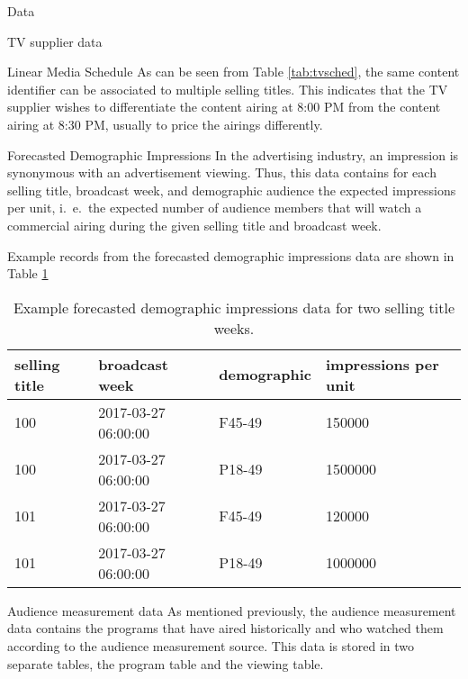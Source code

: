 \begin{chapter}{Data}
\begin{section}{TV supplier data}
\begin{subsection}{Linear Media Schedule}
    As can be seen from Table \ref{tab:tvsched}, the same content identifier can be associated
    to multiple selling titles. This indicates that the TV supplier wishes to differentiate
    the content airing at 8:00 PM from the content airing at 8:30 PM, usually to price the airings differently.

  \end{subsection}

  \begin{subsection}{Forecasted Demographic Impressions}
    In the advertising industry, an impression is synonymous with an advertisement viewing.
    Thus, this data contains for each selling title, broadcast week, and demographic audience the expected impressions per unit, i.\ e.\
    the expected number of audience members that will watch a commercial airing during the given selling title and broadcast week.

    Example records from the forecasted demographic impressions data are shown in Table \ref{tab:tvdem}

    \begin{table}[h!]
      \centering
        \begin{tabular}{llll}
          selling title & broadcast week & demographic & impressions per unit \\
          \hline
          100 & 2017-03-27 06:00:00 & F45-49 & 150000 \\
          100 & 2017-03-27 06:00:00 & P18-49 & 1500000 \\
          101 & 2017-03-27 06:00:00 & F45-49 & 120000 \\
          101 & 2017-03-27 06:00:00 & P18-49 & 1000000 \\
        \end{tabular}
      \caption{Example forecasted demographic impressions data for two selling title weeks.}\label{tab:tvdem}
    \end{table}
  \end{subsection}
\end{section}


\begin{section}{Audience measurement data}
  As mentioned previously, the audience measurement data contains the programs that
  have aired historically and who watched them according to the audience measurement source.
  This data is stored in two separate tables, the program table and the viewing table.


\end{section}
\end{chapter}
